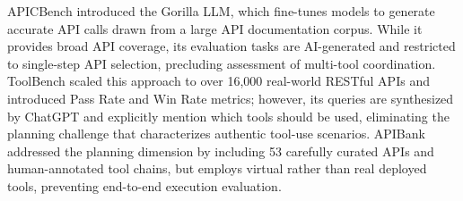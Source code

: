 \documentclass[conference]{IEEEtran}
\begin{document}
\begin{table}[t]
\caption{Comparison of Tool-Use Benchmarks for LLM Agents}
\label{tab:benchmarks}
\renewcommand{\arraystretch}{1.25}
\end{table}

APICBench \cite{patil2023gorilla} introduced the Gorilla LLM, which fine-tunes models to generate accurate API calls drawn from a large API documentation corpus. While it provides broad API coverage, its evaluation tasks are AI-generated and restricted to single-step API selection, precluding assessment of multi-tool coordination. ToolBench \cite{qin2023toolbench} scaled this approach to over 16,000 real-world RESTful APIs and introduced Pass Rate and Win Rate metrics; however, its queries are synthesized by ChatGPT and explicitly mention which tools should be used, eliminating the planning challenge that characterizes authentic tool-use scenarios. APIBank \cite{li2023apibank} addressed the planning dimension by including 53 carefully curated APIs and human-annotated tool chains, but employs virtual rather than real deployed tools, preventing end-to-end execution evaluation.
\end{document}
